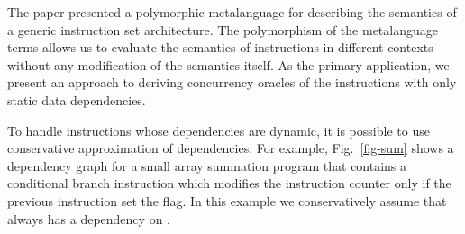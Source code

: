 The paper presented a polymorphic metalanguage for describing the semantics of
a generic instruction set architecture.
The polymorphism of the metalanguage terms allows us to evaluate the semantics
of instructions in different contexts without any modification of the semantics
itself. As the primary application, we present an approach to deriving
concurrency oracles of the instructions with only static data dependencies.

To handle instructions whose dependencies are dynamic, it is possible to use
conservative approximation of dependencies. For example, Fig.~\ref{fig-sum}
shows a dependency graph for a small array summation program that contains
a conditional branch instruction  which modifies the instruction
counter  only if the previous instruction set the  flag. In
this example we conservatively assume that  always has a dependency
on .

